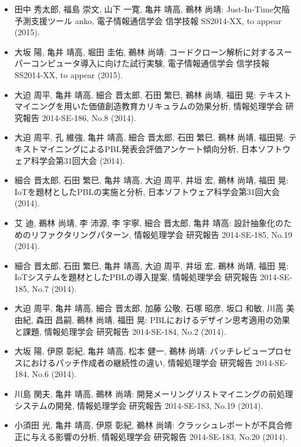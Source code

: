 \documentclass{jarticle}
\begin{document}
\begin{itemize}
\item 田中 秀太郎, 福島 崇文, 山下 一寛, 亀井 靖高, 鵜林 尚靖:
Just-In-Time欠陥予測支援ツール anko,
電子情報通信学会 信学技報 SS2014-XX, to appear (2015).

\item 大坂 陽, 亀井 靖高, 堀田 圭佑, 鵜林 尚靖:
コードクローン解析に対するスーパーコンピュータ導入に向けた試行実験,
電子情報通信学会 信学技報 SS2014-XX, to appear (2015).

\item 大迫 周平, 亀井 靖高, 細合 晋太郎, 石田 繁巳, 鵜林 尚靖, 福田 晃:
テキストマイニングを用いた価値創造教育カリキュラムの効果分析,
情報処理学会 研究報告 2014-SE-186, No.8 (2014).

\item 大迫 周平, 孔 維強, 亀井 靖高, 細合 晋太郎, 石田 繁巳, 鵜林 尚靖, 福田晃:
テキストマイニングによるPBL発表会評価アンケート傾向分析,
日本ソフトウェア科学会第31回大会 (2014).

\item 細合 晋太郎, 石田 繁巳, 亀井 靖高, 大迫 周平, 井垣 宏, 鵜林 尚靖, 福田 晃:
IoTを題材としたPBLの実施と分析,
日本ソフトウェア科学会第31回大会 (2014).

\item 艾 迪, 鵜林 尚靖, 李 沛源, 李 宇寧, 細合 晋太郎, 亀井 靖高:
設計抽象化のためのリファクタリングパターン,
情報処理学会 研究報告 2014-SE-185, No.19 (2014).

\item 細合 晋太郎, 石田 繁巳, 亀井 靖高, 大迫 周平, 井垣 宏, 鵜林 尚靖, 福田 晃:
IoTシステムを題材としたPBLの導入提案,
情報処理学会 研究報告 2014-SE-185, No.7 (2014).

\item 大迫 周平, 亀井 靖高, 細合 晋太郎, 加藤 公敬, 石塚 昭彦, 坂口 和敏, 川高 美由紀, 森田 昌嗣, 鵜林 尚靖, 福田 晃:
PBLにおけるデザイン思考適用の効果と課題,
情報処理学会 研究報告 2014-SE-184, No.2 (2014).

\item 大坂 陽, 伊原 彰紀, 亀井 靖高, 松本 健一, 鵜林 尚靖:
パッチレビュープロセスにおけるパッチ作成者の継続性の違い,
情報処理学会 研究報告 2014-SE-184, No.6 (2014).

\item 川島 関夫, 亀井 靖高, 鵜林 尚靖:
開発メーリングリストマイニングの前処理システムの開発,
情報処理学会 研究報告 2014-SE-183, No.19 (2014).

\item 小須田 光, 亀井 靖高, 伊原 彰紀, 鵜林 尚靖:
クラッシュレポートが不具合修正に与える影響の分析,
情報処理学会 研究報告 2014-SE-183, No.20 (2014).


\end{itemize}
\end{document}

